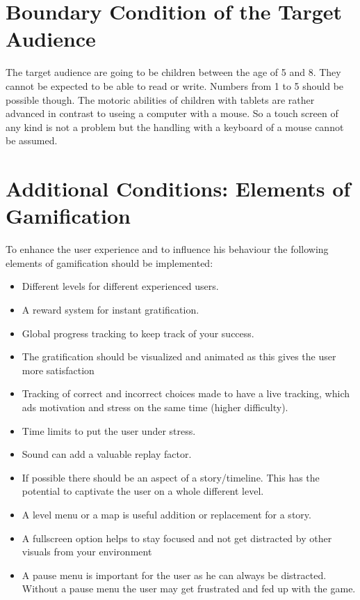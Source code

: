 \section{Boundary Condition of the Target Audience}\label{sec:boundary-condition-of-the-target-audience}
The target audience are going to be children between the age of 5 and 8.
They cannot be expected to be able to read or write. Numbers from 1 to 5 should be possible though.
The motoric abilities of children with tablets are rather advanced in contrast to useing a computer with a mouse.
So a touch screen of any kind is not a problem but the handling with a keyboard of a mouse cannot be assumed.

\section{Additional Conditions: Elements of Gamification}\label{sec:additional-conditions:-elements-of-gamification}
To enhance the user experience and to influence his behaviour the following elements of gamification should be implemented:
\begin{itemize}
    \item Different levels for different experienced users.
    \item A reward system for instant gratification.
    \item Global progress tracking to keep track of your success.
    \item The gratification should be visualized and animated as this gives the user more satisfaction
    \item Tracking of correct and incorrect choices made to have a live tracking, which ads motivation and
    stress on the same time (higher difficulty).
    \item Time limits to put the user under stress.
    \item Sound can add a valuable replay factor.
    \item If possible there should be an aspect of a story/timeline. This has the potential to captivate the user on a
    whole different level.
    \item A level menu or a map is useful addition or replacement for a story.
    \item A fullscreen option helps to stay focused and not get distracted by other visuals from your environment
    \item A pause menu is important for the user as he can always be distracted.
    Without a pause menu the user may get frustrated and fed up with the game.
\end{itemize}
